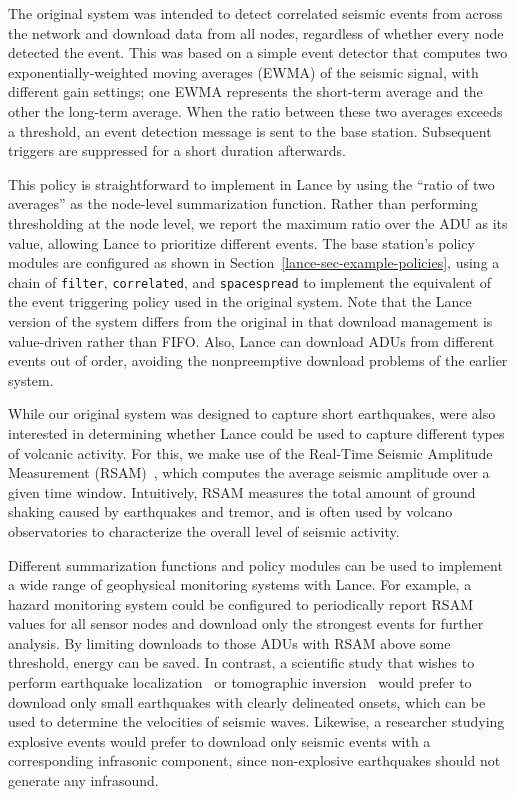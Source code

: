 The original system was intended to detect correlated seismic events from
across the network and download data from all nodes, regardless of whether
every node detected the event. This was based on a simple event detector that
computes two exponentially-weighted moving averages (EWMA) of the seismic
signal, with different gain settings; one EWMA represents the short-term
average and the other the long-term average. When the ratio between these two
averages exceeds a threshold, an event detection message is sent to the base
station. Subsequent triggers are suppressed for a short duration afterwards.

This policy is straightforward to implement in Lance by using the ``ratio of
two averages'' as the node-level summarization function. Rather than
performing thresholding at the node level, we report the maximum ratio over
the ADU as its value, allowing Lance to prioritize different events. The base
station's policy modules are configured as shown in
Section~\ref{lance-sec-example-policies}, using a chain of \texttt{filter},
\texttt{correlated}, and \texttt{spacespread} to implement the equivalent of
the event triggering policy used in the original system. Note that the Lance
version of the system differs from the original in that download management
is value-driven rather than FIFO. Also, Lance can download ADUs from
different events out of order, avoiding the nonpreemptive download problems
of the earlier system.

While our original system was designed to capture short earthquakes, were
also interested in determining whether Lance could be used to capture
different types of volcanic activity. For this, we make use of the Real-Time
Seismic Amplitude Measurement (RSAM)~\cite{rsam}, which computes the average
seismic amplitude over a given time window. Intuitively, RSAM measures the
total amount of ground shaking caused by earthquakes and tremor, and is often
used by volcano observatories to characterize the overall level of seismic
activity.

Different summarization functions and policy modules can be used to implement
a wide range of geophysical monitoring systems with Lance. For example, a
hazard monitoring system could be configured to periodically report RSAM
values for all sensor nodes and download only the strongest events for
further analysis. By limiting downloads to those ADUs with RSAM above some
threshold, energy can be saved. In contrast, a scientific study that wishes
to perform earthquake localization~\cite{aki-richards-80} or tomographic
inversion~\cite{lees-lindley-94} would prefer to download only small
earthquakes with clearly delineated onsets, which can be used to determine
the velocities of seismic waves. Likewise, a researcher studying explosive
events would prefer to download only seismic events with a corresponding
infrasonic component, since non-explosive earthquakes should not generate any
infrasound.

